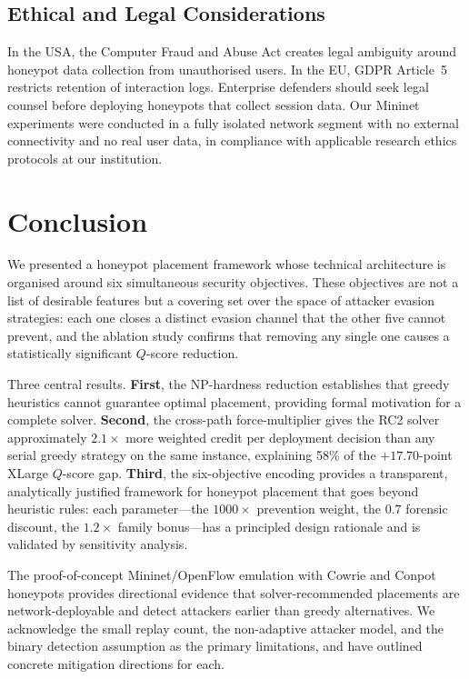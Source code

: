 \documentclass[journal]{IEEEtran}
\newcommand{\qscore}{$Q$-score}
\begin{document}
\subsection{Ethical and Legal Considerations}
In the USA, the Computer Fraud and Abuse Act creates legal ambiguity
around honeypot data collection from unauthorised users. In the EU,
GDPR Article~5 restricts retention of interaction logs. Enterprise
defenders should seek legal counsel before deploying honeypots that
collect session data. Our Mininet experiments were conducted in a
fully isolated network segment with no external connectivity and no
real user data, in compliance with applicable research ethics
protocols at our institution.

\section{Conclusion}
\label{sec:conclusion}

We presented a honeypot placement framework whose technical
architecture is organised around six simultaneous security
objectives. These objectives are not a list of desirable features
but a covering set over the space of attacker evasion strategies:
each one closes a distinct evasion channel that the other five
cannot prevent, and the ablation study confirms that removing any
single one causes a statistically significant \qscore{} reduction.

Three central results. \textbf{First}, the NP-hardness reduction
establishes that greedy heuristics cannot guarantee optimal
placement, providing formal motivation for a complete solver.
\textbf{Second}, the cross-path force-multiplier gives the RC2
solver approximately $2.1\times$ more weighted credit per deployment
decision than any serial greedy strategy on the same instance,
explaining 58\% of the $+17.70$-point XLarge \qscore{} gap.
\textbf{Third}, the six-objective encoding provides a transparent,
analytically justified framework for honeypot placement that goes
beyond heuristic rules: each parameter---the $1000\times$ prevention
weight, the $0.7$ forensic discount, the $1.2\times$ family
bonus---has a principled design rationale and is validated by
sensitivity analysis.

The proof-of-concept Mininet/OpenFlow emulation with Cowrie and
Conpot honeypots provides directional evidence that solver-recommended
placements are network-deployable and detect attackers earlier than
greedy alternatives. We acknowledge the small replay count, the
non-adaptive attacker model, and the binary detection assumption as
the primary limitations, and have outlined concrete mitigation
directions for each.
\end{document}
